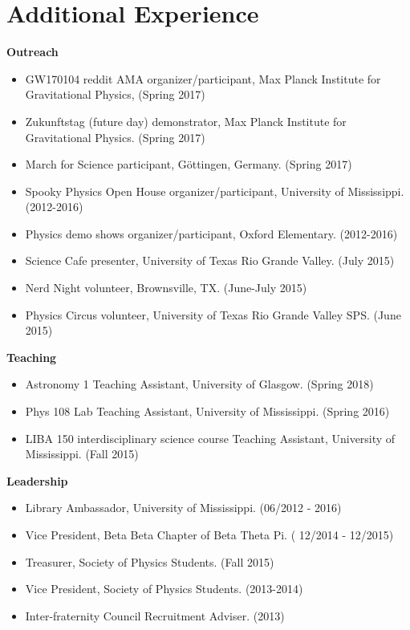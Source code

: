 \section{\sc Additional Experience}

{\bf{Outreach}}\\
\begin{itemize}
\setlength\itemsep{0em}
\item GW170104 reddit AMA organizer/participant, Max Planck Institute for Gravitational Physics, (Spring 2017)
\item Zukunftstag (future day) demonstrator, Max Planck Institute for Gravitational Physics. (Spring 2017)
\item March for Science participant, G{\"o}ttingen, Germany. (Spring 2017) 
\item Spooky Physics Open House organizer/participant, University of Mississippi. (2012-2016)
\item Physics demo shows organizer/participant, Oxford Elementary. (2012-2016)
\item Science Cafe presenter, University of Texas Rio Grande Valley. (July 2015)
\item Nerd Night volunteer, Brownsville, TX. (June-July 2015)
\item Physics Circus volunteer, University of Texas Rio Grande Valley SPS. (June 2015)
\end{itemize}

{\bf{Teaching}}\\
\begin{itemize}
\setlength\itemsep{0em}
\item Astronomy 1 Teaching Assistant, University of Glasgow. (Spring 2018)
\item Phys 108 Lab Teaching Assistant, University of Mississippi. (Spring 2016)
\item LIBA 150 interdisciplinary science course Teaching Assistant, University of Mississippi. (Fall 2015)
\end{itemize}

{\bf{Leadership}}\\
\begin{itemize}
\setlength\itemsep{0em}
\item Library Ambassador, University of Mississippi. (06/2012 - 2016)
\item Vice President, Beta Beta Chapter of Beta Theta Pi. ( 12/2014 - 12/2015)
\item Treasurer, Society of Physics Students. (Fall 2015)
\item Vice President, Society of Physics Students. (2013-2014)
\item Inter-fraternity Council Recruitment Adviser. (2013)
\end{itemize}


